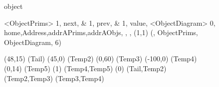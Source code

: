 \documentclass{article}
\begin{document}
\begin {figure}
\hspace{.05cm}
\Draw
 {object}

\Indirect \Table <ObjectPrims>
{  
	1, next, \THead &
    1, prev, \TTail &
    1, value, \TSize
}
\Indirect \Table <ObjectDiagram>
 {  0, home,Address,addrAPrims,addrAObjs, , , }
\Scale (1,1)
\OD (\TName, ObjectPrims, ObjectDiagram, 6)

\Move(48,15)
\FcNode(Tail)
\Move(45,0)
\FcNode(Temp2)
\Move(0,60)
\FcNode(Temp3)
\Move(-100,0)
\FcNode(Temp4)
\Move(0,14)
\FcNode(Temp5)
\ArrowHeads(1)
\Edge(Temp4,Temp5)
\ArrowHeads(0)
\Edge(Tail,Temp2)
\Edge(Temp2,Temp3)
\Edge(Temp3,Temp4)
\EndDraw

\caption {\Caption}

\label {fig:ObjectDiagram}

\end {figure}
\end{document}
